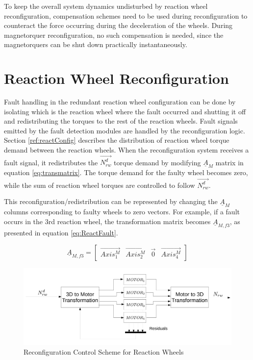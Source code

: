 To keep the overall system dynamics undisturbed by reaction wheel reconfiguration, compensation schemes need to be used during reconfiguration to counteract the force occurring during the deceleration of the wheels. During magnetorquer reconfiguration, no such compensation is needed, since the magnetorquers can be shut down practically instantaneously.

 
\section{Reaction Wheel Reconfiguration}
\label{sec:rwReconfig}
Fault handling in the redundant reaction wheel configuration can be done by isolating which is the reaction wheel where the fault occurred and shutting it off and redistributing the torques to the rest of the reaction wheels. Fault signals emitted by the fault detection modules are handled by the reconfiguration logic. Section \ref{ref:reactConfig} describes the distribution of reaction wheel torque demand between the reaction wheels. When the reconfiguration system receives a fault signal, it redistributes the $\vec{N_{rw}^d}$ torque demand by modifying $\underline{A}_M$ matrix in equation \ref{eq:transmatrix}. The torque demand for the faulty wheel becomes zero, while the sum of reaction wheel torques are controlled to follow $\vec{N_{rw}^d}$.

This reconfiguration/redistribution can be represented by changing the $\underline{A}_M$ columns corresponding to faulty wheels to zero vectors. For example, if a fault occurs in the 3rd reaction wheel, the transformation matrix becomes $\underline{A}_{M,f3}$, as presented in equation \ref{eq:ReactFault}.

\begin{equation}
	\label{eq:ReactFault}
	\underline{A}_{M,f3} = \begin{bmatrix}
		\vec{Axis^{M}_{1}}       & \vec{Axis^{M}_{2}}   & \vec{0}   & \vec{Axis^{M}_{4}} 
	\end{bmatrix} 
\end{equation}

\begin{figure}[H]
	\centering 
	\includegraphics[width=170mm]{figures/reconfig.pdf}	
	\caption{Reconfiguration Control Scheme for Reaction Wheels}
	\label{fig:reconfig}
\end{figure}

